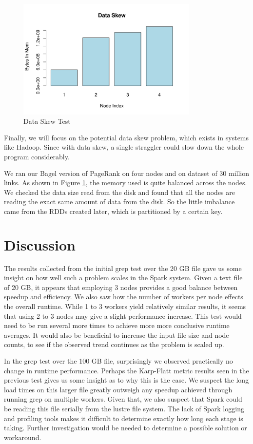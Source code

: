\documentclass{article}
\begin{document}
\begin{figure}[H]
        \centering
        \includegraphics[width=90mm]{images/skew.png}
        \caption{Data Skew Test}
        \label{fig:dataskew}
    \end{figure}

Finally, we will focus on the potential data skew problem, which exists in systems
like Hadoop. Since with data skew, a single straggler could slow down the whole
program considerably.

We ran our Bagel version of PageRank on four nodes and on dataset of 30 million
links. As shown in Figure \ref{fig:dataskew}, the memory used is quite balanced
across the nodes. We checked the data size read from the disk and found that
all the nodes are reading the exact same amount of data from the disk. So the
little imbalance came from the RDDs created later, which is partitioned by a
certain key.


\section{Discussion}
The results collected from the initial grep test over the 20 GB file gave us
some insight on how well such a problem scales in the Spark system. Given a
text file of 20 GB, it appears that employing 3 nodes provides a good balance
between speedup and efficiency. We also saw how the number of workers per node
effects the overall runtime. While 1 to 3 workers yield relatively similar
results, it seems that using 2 to 3 nodes may give a slight performance
increase. This test would need to be run several more times to achieve more
more conclusive runtime averages. It would also be beneficial to increase the
input file size and node counts, to see if the observed trend continues as the
problem is scaled up.

In the grep test over the 100 GB file, surprisingly we observed practically no
change in runtime performance. Perhaps the Karp-Flatt metric results seen in the
previous test gives us some insight as to why this is the case. We suspect the
long load times on this larger file greatly outweigh any speedup achieved
through running grep on multiple workers. Given that, we also suspect that
Spark could be reading this file serially from the lustre file system. The
lack of Spark logging and profiling tools makes it difficult to determine
exactly how long each stage is taking. Further investigation would be needed
to determine a possible solution or workaround.
\end{document}
